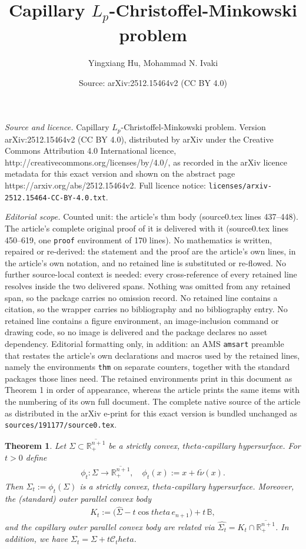 \documentclass[10pt,a4paper]{amsart}
\title{Capillary $L_p$-Christoffel-Minkowski problem}
\author{Yingxiang Hu, Mohammad N. Ivaki}
\date{Source: arXiv:2512.15464v2 (CC BY 4.0)}
\newtheorem{thm}{Theorem}
\newcommand{\Cth}{\cC_\theta}
\newcommand{\Si}{\Sigma}
\newcommand{\bbB}{\mathbb{B}}
\newcommand{\bbR}{\mathbb{R}}
\newcommand{\cC}{\mathcal{C}}
\newcommand{\eq}[1]{\begin{equation}\begin{alignedat}{2}#1\end{alignedat}\end{equation}}
\newcommand{\ov}{\overline}
\def\theta{theta}%
\newcommand{\wh}{\widehat}
\begin{document}
\maketitle

\noindent\emph{Source and licence.} Capillary $L_p$-Christoffel-Minkowski problem. Version arXiv:2512.15464v2 (CC BY 4.0), distributed by arXiv under the Creative Commons Attribution 4.0 International licence, http://creativecommons.org/licenses/by/4.0/, as recorded in the arXiv licence metadata for this exact version and shown on the abstract page https://arxiv.org/abs/2512.15464v2. Full licence notice: \texttt{licenses/arxiv-2512.15464-CC-BY-4.0.txt}.\par\smallskip

\noindent\textit{Editorial scope.} Counted unit: the article's thm body (source0.tex lines 437--448). The article's complete original proof of it is delivered with it (source0.tex lines 450--619, one \texttt{proof} environment of 170 lines). No mathematics is written, repaired or re-derived: the statement and the proof are the article's own lines, in the article's own notation, and no retained line is substituted or re-flowed.  No further source-local context is needed: every cross-reference of every retained line resolves inside the two delivered spans.  Nothing was omitted from any retained span, so the package carries no omission record.  No retained line contains a citation, so the wrapper carries no bibliography and no bibliography entry.  No retained line contains a figure environment, an image-inclusion command or drawing code, so no image is delivered and the package declares no asset dependency.  Editorial formatting only, in addition: an AMS \texttt{amsart} preamble that restates the article's own declarations and macros used by the retained lines, namely the environments \texttt{thm} on separate counters, together with the standard packages those lines need.  The retained environments print in this document as Theorem 1 in order of appearance, whereas the article prints the same items with the numbering of its own full document.  The complete native source of the article as distributed in the arXiv e-print for this exact version is bundled unchanged as \texttt{sources/191177/source0.tex}.
\begin{thm}\label{lem:tilde-nu-parallel body}
Let $\Sigma\subset\ov{\bbR^{n+1}_+}$ be a strictly convex, $\theta$-capillary hypersurface.
For $t>0$ define
\eq{ \phi_t:\Sigma\to\ov{\bbR^{n+1}_+},\quad \phi_t(x):=x+t \tilde\nu(x).
}
Then $\Sigma_t:=\phi_t(\Sigma)$ is a strictly convex, $\theta$-capillary hypersurface. Moreover, the (standard) outer parallel convex body
\eq{
  K_t:=\bigl(\widehat{\Sigma}-t\cos\theta\,e_{n+1}\bigr)+t\,\bbB,
}
and the capillary outer parallel convex body are related via $\wh{\Si_t}=K_t\cap \ov{\bbR^{n+1}_+}$.
In addition, we have $\Si_t=\Si+t\Cth$.
\end{thm}
\end{document}
